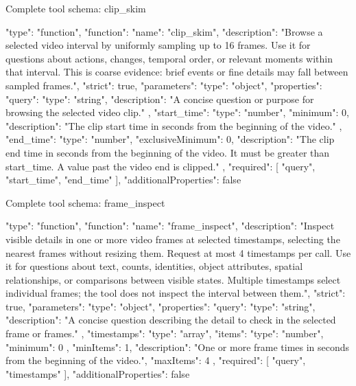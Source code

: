\begin{AppendixPrompt}{Complete tool schema: clip\_skim}
\begin{ToolSchema}
{
  "type": "function",
  "function": {
    "name": "clip_skim",
    "description": "Browse a selected video interval by uniformly sampling up to 16 frames. Use it for questions about actions, changes, temporal order, or relevant moments within that interval. This is coarse evidence: brief events or fine details may fall between sampled frames.",
    "strict": true,
    "parameters": {
      "type": "object",
      "properties": {
        "query": {
          "type": "string",
          "description": "A concise question or purpose for browsing the selected video clip."
        },
        "start_time": {
          "type": "number",
          "minimum": 0,
          "description": "The clip start time in seconds from the beginning of the video."
        },
        "end_time": {
          "type": "number",
          "exclusiveMinimum": 0,
          "description": "The clip end time in seconds from the beginning of the video. It must be greater than start_time. A value past the video end is clipped."
        }
      },
      "required": [
        "query",
        "start_time",
        "end_time"
      ],
      "additionalProperties": false
    }
  }
}
\end{ToolSchema}
\end{AppendixPrompt}

\begin{AppendixPrompt}{Complete tool schema: frame\_inspect}
\begin{ToolSchema}
{
  "type": "function",
  "function": {
    "name": "frame_inspect",
    "description": "Inspect visible details in one or more video frames at selected timestamps, selecting the nearest frames without resizing them. Request at most 4 timestamps per call. Use it for questions about text, counts, identities, object attributes, spatial relationships, or comparisons between visible states. Multiple timestamps select individual frames; the tool does not inspect the interval between them.",
    "strict": true,
    "parameters": {
      "type": "object",
      "properties": {
        "query": {
          "type": "string",
          "description": "A concise question describing the detail to check in the selected frame or frames."
        },
        "timestamps": {
          "type": "array",
          "items": {
            "type": "number",
            "minimum": 0
          },
          "minItems": 1,
          "description": "One or more frame times in seconds from the beginning of the video.",
          "maxItems": 4
        }
      },
      "required": [
        "query",
        "timestamps"
      ],
      "additionalProperties": false
    }
  }
}
\end{ToolSchema}
\end{AppendixPrompt}

